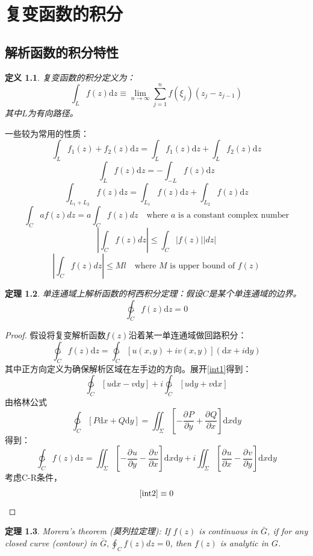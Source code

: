 \documentclass[10pt, a4paper, oneside]{ctexbook}
\newtheorem{theorem}{定理}[section]
\newtheorem{definition}[theorem]{定义}
\def\D{\mathrm{d}}
\def\Fex{\ensuremath{u(x,y)+iv(x,y)}}
\newcommand{\partdev}[3][]
{\ensuremath{\frac{\displaystyle \partial^{#1} #2}{ \displaystyle \partial #3}}}
\newcommand{\F}[1][z]
{\ensuremath{f(#1)}}
\begin{document}
\chapter{ 复变函数的积分}

\section{解析函数的积分特性}

\begin{definition}
    复变函数的积分定义为：
    $$\int_L f(z) \D z \equiv \lim_{n\to\infty}\sum_{j=1}^n f(\xi_j)(z_j-z_{j-1})$$
    其中$L$为有向路径。
\end{definition}
一些较为常用的性质：
$$\int_L f_1(z)+f_2(z)\D z=\int_L f_1(z)\D z+\int_L f_2(z)\D z$$
$$\int_L f(z)\D z = -\int_{-L} f(z)\D z$$
$$\int_{L_1+L_2} f(z)\D z = \int_{L_1} f(z)\D z+\int_{L_2} f(z)\D z$$
$$\int_{C} a f(z) d z=a \int_{C} f(z) d z \quad \text{where $a$ is a constant complex number}$$ 
\begin{equation*}
\left|\int_{C} f(z) d z\right| \leq \int_{C}|f(z)||d z|
\end{equation*}
$$\left|\int_{C} f(z) d z\right| \leq M l \quad \text{where $M$ is upper bound of $f(z)$}$$
\begin{theorem}
    单连通域上解析函数的柯西积分定理：假设$C$是某个单连通域的边界。
    $$\ointctrclockwise_C \F \D z = 0$$
\end{theorem}
\begin{proof}
    假设将复变解析函数$\F$沿着某一单连通域做回路积分：
\begin{equation}
    \label{int1}
    \ointctrclockwise_C \F \D z = \ointctrclockwise_C \left[\Fex\right](\D x + i \D y)
\end{equation}
其中正方向定义为确保解析区域在左手边的方向。展开\ref{int1}得到：
$$\ointctrclockwise_C \left[u\D x- v\D y\right] + i \ointctrclockwise_C \left[u\D y+ v\D x\right]$$
由格林公式
$$\ointctrclockwise_C \left[P\D x+ Q\D y\right] = \iint_\Sigma \left[-\partdev{P}{y}+\partdev{Q}{x}\right]\D x\D y$$
得到：
\begin{equation}
    \label{int2}
    \ointctrclockwise_C \F \D z=  \iint_\Sigma \left[-\partdev{u}{y}-\partdev{v}{x}\right]\D x\D y+i\iint_{\Sigma} \left[\partdev{u}{x}-\partdev{v}{y}\right]\D x\D y
\end{equation}
考虑{\rm C-R}条件，
$$\ref{int2}\equiv 0$$
\end{proof}
\begin{theorem}
    \rm
    Morera's theorem (莫列拉定理): If $f(z)$ is continuous in $\bar{G}$, if for any closed curve (contour) in $\displaystyle \bar{G}, \oint_{C} f(z) d z=0$, then $f(z)$ is analytic in $G$.
\end{theorem}
\end{document}
